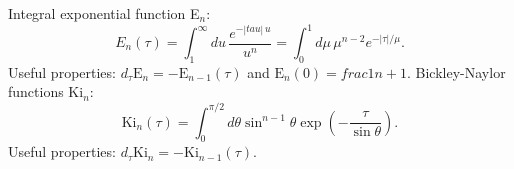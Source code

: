
\begin{frame}
  \frametitle{\insertsubsectionhead}
  {
  Integral exponential function E$_n$:
  \[
    E_n(\tau) = \int_1^{\infty}{du\, \frac{e^{-|tau|\,u}}{u^n}}
      = \int_0^1 {d\mu \, \mu^{n-2} e^{-|\tau| / \mu}}.
  \]
  Useful properties: $d_{\tau} \text{E}_n = -\text{E}_{n-1}(\tau)$ and
  $\text{E}_n(0)={frac{1}{n+1}}$.
  \vspace{10mm}
  Bickley-Naylor functions Ki$_n$:
  \[
    \text{Ki}_n(\tau) = \int_0^{\pi/2}{ d\theta \sin^{n-1} \theta \exp\left(-\frac{\tau}{\sin \theta}\right) }.
  \]
  Useful properties: $d_{\tau} \text{Ki}_n = -\text{Ki}_{n-1}(\tau)$.
  }
\end{frame}
